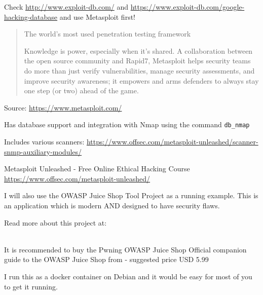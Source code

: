 \documentclass[Screen16to9,17pt]{foils}
\begin{document}


Check \url{http://www.exploit-db.com/} and
\url{https://www.exploit-db.com/google-hacking-database} and use Metasploit first!



\begin{quote}
The world’s most used penetration testing framework

Knowledge is power, especially when it’s shared. A collaboration between the open source community and Rapid7, Metasploit helps security teams do more than just verify vulnerabilities, manage security assessments, and improve security awareness; it empowers and arms defenders to always stay one step (or two) ahead of the game.
\end{quote}
Source: \url{https://www.metasploit.com/}

\begin{list2}
\item Has database support and integration with Nmap using the command \verb+db_nmap+
\item Includes various scanners: \url{https://www.offsec.com/metasploit-unleashed/scanner-snmp-auxiliary-modules/}
\item Metasploit Unleashed - Free Online Ethical Hacking Course\\
\url{https://www.offsec.com/metasploit-unleashed/}
\end{list2}


I will also use the OWASP Juice Shop Tool Project as a running example. This is an application which is modern AND designed to have security flaws.

Read more about this project at:\\
\\

It is recommended to buy the Pwning OWASP Juice Shop Official companion guide to the OWASP Juice Shop from  - suggested price USD 5.99

I run this as a docker container on Debian and it would be easy for most of you to get it running.

\end{document}
